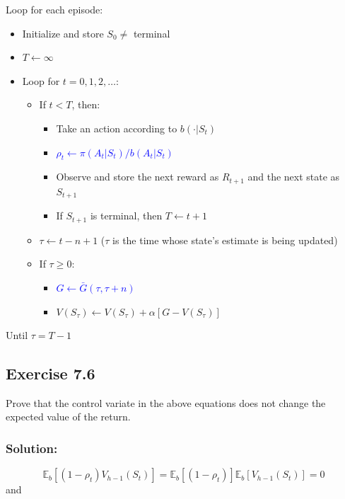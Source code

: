 {\begin{minipage}{0.95\textwidth}
Loop for each episode:
\begin{itemize}[left=0em]
    \item[] Initialize and store $S_0 \neq$ terminal
    \item[] $T \leftarrow \infty$
    \item[] Loop for $t = 0, 1, 2, \dots$:
    \begin{itemize}[left=0em]
        \item[] If $t < T$, then:
        \begin{itemize}[left=0em]
            \item[] Take an action according to $b(\cdot | S_t)$
            \item[] \textcolor{blue}{$\rho_t \leftarrow \pi(A_t | S_t) / b(A_t | S_t)$}
            \item[] Observe and store the next reward as $R_{t+1}$ and the next state as $S_{t+1}$
            \item[] If $S_{t+1}$ is terminal, then $T \leftarrow t+1$
        \end{itemize}
        \item[] $\tau \leftarrow t - n + 1$ \hspace{1cm} ($\tau$ is the time whose state's estimate is being updated)
        \item[] If $\tau \geq 0$:
        \begin{itemize}[left=0em]
            \item[] \textcolor{blue}{$G \leftarrow \bar{G}(\tau, \tau+n)$}
            \item[] $V(S_{\tau}) \leftarrow V(S_{\tau}) + \alpha \left[ G - V(S_{\tau}) \right]$
        \end{itemize}
    \end{itemize}
\end{itemize}
Until $\tau = T - 1$

\end{minipage}
}


\subsection*{Exercise 7.6}
Prove that the control variate in the above equations does not change the
expected value of the return.

\subsubsection*{Solution:}
\[
    \mathbb{E}_b \left[ (1 - \rho_t) V_{h-1}(S_t) \right]  = \mathbb{E}_b \left[ (1 - \rho_t) \right] \mathbb{E}_b \left[ V_{h-1}(S_t) \right]  = 0
\]
and

